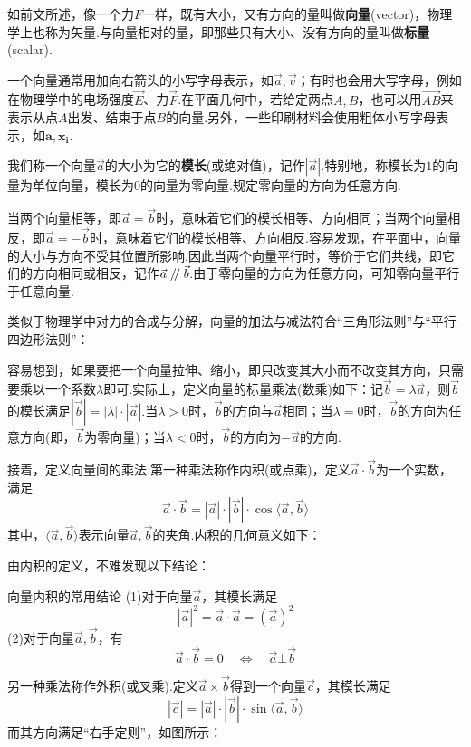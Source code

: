 \documentclass[lang=cn, zihao=5]{elegantbook}
\newcommand{\xl}[1]{\overrightarrow{#1}}
\newcommand{\pll}{\kern 0.56em/\kern -0.8em /\kern 0.56em}
\begin{document}
如前文所述，像一个力$F$一样，既有大小，又有方向的量叫做\textbf{向量}(vector)，物理学上也称为矢量.与向量相对的量，即那些只有大小、没有方向的量叫做\textbf{标量}(scalar).

一个向量通常用加向右箭头的小写字母表示，如$\vec{a},\vec{v}$；有时也会用大写字母，例如在物理学中的电场强度$\vec{E}$、力$\vec{F}$.在平面几何中，若给定两点$A,B$，也可以用$\xl{AB}$来表示从点$A$出发、结束于点$B$的向量.另外，一些印刷材料会使用粗体小写字母表示，如$\boldsymbol{a},\boldsymbol{x_i}$.

我们称一个向量$\vec{a}$的大小为它的\textbf{模长}(或绝对值)，记作$|\vec{a}|$.特别地，称模长为$1$的向量为单位向量，模长为$0$的向量为零向量.规定零向量的方向为任意方向.

当两个向量相等，即$\vec{a}=\vec{b}$时，意味着它们的模长相等、方向相同；当两个向量相反，即$\vec{a}=-\vec{b}$时，意味着它们的模长相等、方向相反.容易发现，在平面中，向量的大小与方向不受其位置所影响.因此当两个向量平行时，等价于它们共线，即它们的方向相同或相反，记作$\vec{a} \pll \vec{b}$.由于零向量的方向为任意方向，可知零向量平行于任意向量.

类似于物理学中对力的合成与分解，向量的加法与减法符合“三角形法则”与“平行四边形法则”：


容易想到，如果要把一个向量拉伸、缩小，即只改变其大小而不改变其方向，只需要乘以一个系数$\lambda$即可.实际上，定义向量的标量乘法(数乘)如下：记$\vec{b}=\lambda \vec{a}$，则$\vec{b}$的模长满足$|\vec{b}|=|\lambda | \cdot |\vec{a}|$.当$\lambda > 0$时，$\vec{b}$的方向与$\vec{a}$相同；当$\lambda = 0$时，$\vec{b}$的方向为任意方向(即，$\vec{b}$为零向量)；当$\lambda < 0$时，$\vec{b}$的方向为$-\vec{a}$的方向.

接着，定义向量间的乘法.第一种乘法称作内积(或点乘)，定义$\vec{a} \cdot \vec{b}$为一个实数，满足$$\vec{a} \cdot \vec{b} = |\vec{a}| \cdot |\vec{b}| \cdot \cos \langle \vec{a},\vec{b} \rangle$$
其中，$\langle \vec{a},\vec{b} \rangle$表示向量$\vec{a},\vec{b}$的夹角.内积的几何意义如下：


由内积的定义，不难发现以下结论：

\begin{proposition}{向量内积的常用结论}
	(1)对于向量$\vec{a}$，其模长满足$$|\vec{a}|^2=\vec{a} \cdot \vec{a} = (\vec{a})^2$$
	(2)对于向量$\vec{a},\vec{b}$，有$$\vec{a} \cdot \vec{b} = 0 \quad \Longleftrightarrow \quad \vec{a} \bot \vec{b}$$
\end{proposition}

另一种乘法称作外积(或叉乘).定义$\vec{a} \times \vec{b}$得到一个向量$\vec{c}$，其模长满足$$|\vec{c}|=|\vec{a}| \cdot |\vec{b}| \cdot \sin \langle \vec{a},\vec{b} \rangle $$
而其方向满足“右手定则”，如图所示：
\end{document}
